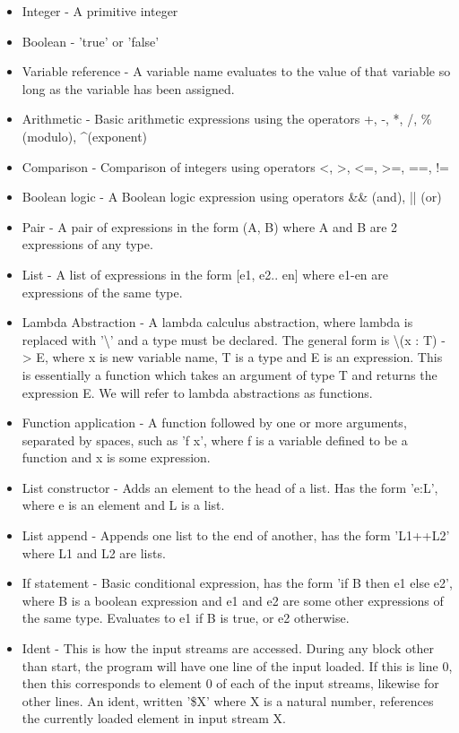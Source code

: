 \documentclass{article}
\begin{document}
\begin{itemize}
    \item Integer - A primitive integer
    \item Boolean - 'true' or 'false'
    \item Variable reference - A variable name evaluates to the value of that variable so long as the variable has been assigned.
    \item Arithmetic - Basic arithmetic expressions using the operators +, -, *, /, \% (modulo), \textasciicircum (exponent)
    \item Comparison - Comparison of integers using operators <, >, <=, >=, ==, !=
    \item Boolean logic - A Boolean logic expression using operators \&\& (and), || (or)
    \item Pair - A pair of expressions in the form (A, B) where A and B are 2 expressions of any type.
    \item List - A list of expressions in the form [e1, e2.. en] where e1-en are expressions of the same type.
    \item Lambda Abstraction - A lambda calculus abstraction, where lambda is replaced with '\textbackslash' and a type must be declared. The general form is \textbackslash(x : T) -> E, where x is new variable name, T is a type and E is an expression. This is essentially a function which takes an argument of type T and returns the expression E. We will refer to lambda abstractions as functions.
    \item Function application - A function followed by one or more arguments, separated by spaces, such as 'f x', where f is a variable defined to be a function and x is some expression.
    \item List constructor - Adds an element to the head of a list. Has the form 'e:L', where e is an element and L is a list.
    \item List append - Appends one list to the end of another, has the form 'L1++L2' where L1 and L2 are lists.
    \item If statement - Basic conditional expression, has the form 'if B then e1 else e2', where B is a boolean expression and e1 and e2 are some other expressions of the same type. Evaluates to e1 if B is true, or e2 otherwise.
    \item Ident - This is how the input streams are accessed. During any block other than start, the program will have one line of the input loaded. If this is line 0, then this corresponds to element 0 of each of the input streams, likewise for other lines. An ident, written '\$X' where X is a natural number, references the currently loaded element in input stream X. 

\end{itemize}
\end{document}
